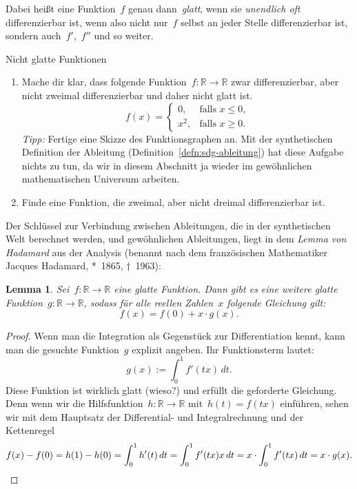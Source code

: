 \documentclass[twoside]{../zirkelblatt}
\newcommand{\RR}{\mathbb{R}}
\theoremstyle{definition}
\theoremstyle{plain}
\newtheorem{lemma}[defn]{Lemma}
\theoremstyle{remark}
\begin{document}

Dabei heißt eine Funktion~$f$ genau dann~\emph{glatt}, wenn sie \emph{unendlich
oft} differenzierbar ist, wenn also nicht nur~$f$ selbst an jeder Stelle
differenzierbar ist, sondern auch~$f'$,~$f''$ und so weiter.

\begin{aufgabeShaded}{Nicht glatte Funktionen}
\begin{enumerate}
\item Mache dir klar, dass folgende Funktion~$f : \RR \to \RR$ zwar differenzierbar,
aber nicht zweimal differenzierbar und daher nicht glatt ist.
\[ f(x) = \begin{cases}
  0, & \text{falls~$x \leq 0$,} \\
  x^2, & \text{falls~$x \geq 0$.}
\end{cases} \]
\emph{Tipp:} Fertige eine Skizze des Funktionsgraphen an. Mit der synthetischen
Definition der Ableitung (Definition~\ref{defn:sdg-ableitung}) hat diese
Aufgabe nichts zu tun, da wir in diesem Abschnitt ja wieder im gewöhnlichen
mathematischen Universum arbeiten.
\item Finde eine Funktion, die zweimal, aber nicht dreimal differenzierbar ist.
\end{enumerate}
\end{aufgabeShaded}

Der Schlüssel zur Verbindung zwischen Ableitungen, die in der synthetischen
Welt berechnet werden, und gewöhnlichen Ableitungen, liegt in dem \emph{Lemma
von Hadamard} aus der Analysis (benannt nach dem französischen Mathematiker
Jacques Hadamard, *~1865, †~1963):

\begin{lemma}Sei~$f : \RR \to \RR$ eine glatte Funktion. Dann gibt es eine
weitere glatte Funktion~$g : \RR \to \RR$, sodass für alle reellen Zahlen~$x$
folgende Gleichung gilt:
\[ f(x) = f(0) + x \cdot g(x). \]
\end{lemma}
\begin{proof}Wenn man die Integration als Gegenstück zur Differentiation kennt,
kann man die gesuchte Funktion~$g$ explizit angeben. Ihr Funktionsterm lautet:
\[ g(x) := \int_0^1 f'(tx) \, dt. \]
Diese Funktion ist wirklich glatt (wieso?) und erfüllt die geforderte
Gleichung. Denn wenn wir die Hilfsfunktion~$h : \RR \to \RR$ mit~$h(t) = f(tx)$
einführen, sehen wir mit dem Hauptsatz der Differential- und Integralrechnung
und der Kettenregel
\[
  f(x) - f(0) = h(1) - h(0) =
  \int_0^1 h'(t) \,dt
  = \int_0^1 f'(tx) x \,dt
  = x \cdot \int_0^1 f'(tx) \,dt
  = x \cdot g(x). \qedhere
\]
\end{proof}
\end{document}
